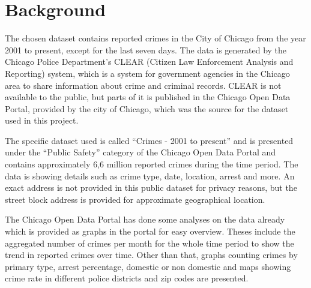 \section{Background}


The chosen dataset contains reported crimes in the City of Chicago from the year 2001 to present, except for the last seven days. The data is generated by the Chicago Police Department’s CLEAR (Citizen Law Enforcement Analysis and Reporting) system, which is a system for government agencies in the Chicago area to share information about crime and criminal records. CLEAR is not available to the public, but parts of it is published in the Chicago Open Data Portal, provided by the city of Chicago, which was the source for the dataset used in this project. 

The specific dataset used is called “Crimes - 2001 to present” and is presented under the “Public Safety” category of the Chicago Open Data Portal and contains approximately 6,6 million reported crimes during the time period. The data is showing details such as crime type, date, location, arrest and more. An exact address is not provided in this public dataset for privacy reasons, but the street block address is provided for approximate geographical location. 

The Chicago Open Data Portal has done some analyses on the data already which is provided as graphs in the portal for easy overview. Theses include the aggregated number of crimes per month for the whole time period to show the trend in reported crimes over time. Other than that, graphs counting crimes by primary type, arrest percentage, domestic or non domestic and maps showing crime rate in different police districts and zip codes are presented. 
